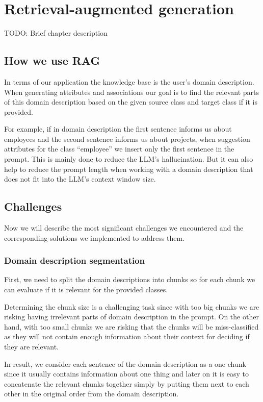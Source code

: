 \chapter{Retrieval-augmented generation}

TODO: Brief chapter description


\section{How we use RAG}
In terms of our application the knowledge base is the user's domain description. When generating attributes and associations our goal is to find the relevant parts of this domain description based on the given source class and target class if it is provided.

For example, if in domain description the first sentence informs us about employees and the second sentence informs us about projects, when suggestion attributes for the class ``employee'' we insert only the first sentence in the prompt. This is mainly done to reduce the LLM's hallucination. But it can also help to reduce the prompt length when working with a domain description that does not fit into the LLM's context window size.



\section{Challenges}

Now we will describe the most significant challenges we encountered and the corresponding solutions we implemented to address them.

\subsection{Domain description segmentation}

First, we need to split the domain descriptions into chunks so for each chunk we can evaluate if it is relevant for the provided classes.

Determining the chunk size is a challenging task since with too big chunks we are risking having irrelevant parts of domain description in the prompt. On the other hand, with too small chunks we are risking that the chunks will be miss-classified as they will not contain enough information about their context for deciding if they are relevant.

In result, we consider each sentence of the domain description as a one chunk since it usually contains information about one thing and later on it is easy to concatenate the relevant chunks together simply by putting them next to each other in the original order from the domain description.


